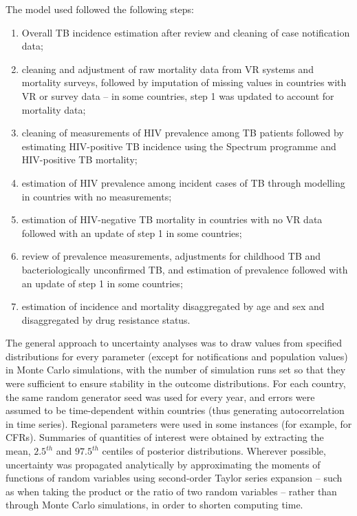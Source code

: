 The model used followed the following steps: 

\begin{enumerate}
\item Overall TB incidence estimation after review and cleaning of case notification data;
\item cleaning and adjustment of raw mortality data from VR systems and mortality surveys, followed by imputation of missing values in countries with VR or survey data – in some countries, step 1 was updated to account for mortality data;
\item cleaning of measurements of HIV prevalence among TB patients followed by estimating HIV-positive TB incidence using the Spectrum programme and HIV-positive TB mortality;
\item estimation of HIV prevalence among incident cases of TB through modelling in countries with no measurements;
\item estimation of HIV-negative TB mortality in countries with no VR data followed with an update of step 1 in some countries; 
\item review of prevalence measurements, adjustments for childhood TB and bacteriologically unconfirmed TB,  and estimation of prevalence followed with an update of step 1 in some countries; 
\item estimation of incidence and mortality disaggregated by age and sex and disaggregated by drug resistance status.
\end{enumerate}

The general approach to uncertainty analyses was to draw values from specified distributions for every parameter (except for notifications and population values) in Monte Carlo simulations, with the number of simulation runs set so that they were sufficient to ensure stability in the outcome distributions. For each country, the same random generator seed was used for every year, and errors were assumed to be time-dependent within countries (thus generating autocorrelation in time series). Regional parameters were used in some instances (for example, for CFRs). Summaries of quantities of interest were obtained by extracting the mean, $2.5^{th}$ and $97.5^{th}$ centiles of posterior distributions. Wherever possible, uncertainty was propagated analytically by approximating the moments of functions of random variables using second-order Taylor series expansion\cite{Ku_1966} – such as when taking the product or the ratio of two random variables – rather than through Monte Carlo simulations, in order to shorten computing time. 

